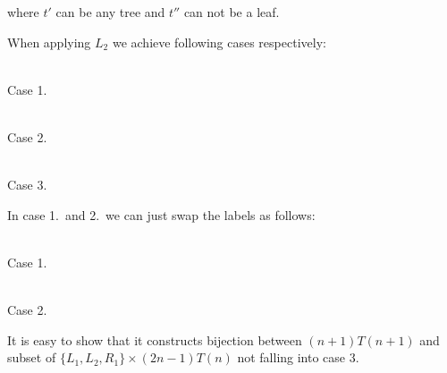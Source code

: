 \documentclass[final]{article}
\theoremstyle{definition}
\theoremstyle{remark}
\begin{document}
where \(t'\) can be any tree and \(t''\) can not be a leaf.

When applying \(L_2\) we achieve following cases respectively:

\begin{center}
    \begin{minipage}[t]{.3\textwidth}
        \begin{center}
            \\
            Case 1.
        \end{center}
    \end{minipage}%
    \begin{minipage}[t]{.3\textwidth}
        \begin{center}
            \\
            Case 2.
        \end{center}
    \end{minipage}%
    \begin{minipage}[t]{.3\textwidth}
        \begin{center}
            \\
            Case 3.
        \end{center}
    \end{minipage}%
\end{center}

In case 1.\ and 2.\ we can just swap the labels as follows:

\begin{center}
    \begin{minipage}[t]{.3\textwidth}
        \begin{center}
            \\
            Case 1.
        \end{center}
    \end{minipage}%
    \begin{minipage}[t]{.3\textwidth}
        \begin{center}
            \\
            Case 2.
        \end{center}
    \end{minipage}%
\end{center}

It is easy to show that it constructs bijection between \((n + 1) T(n + 1)\) and subset of \(\{L_1, L_2, R_1\} \times (2 n - 1) T(n)\) not falling into case 3.
\end{document}
